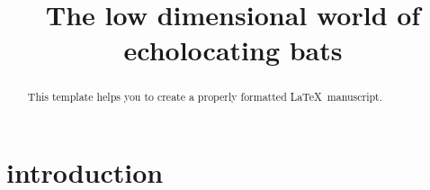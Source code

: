 \documentclass[preprint,5p]{elsarticle}
\begin{document}
\newcommand{\pca}{25}
\newcommand{\prepca}{92}
\newcommand{\nneurons}{200}
\newcommand{\nweights}{37 thousand}

\newcommand{\noise}{\mathcal{N}}
\newcommand{\noisefloor}{\mathcal{N}_f}
\newcommand{\stochasticnoise}{\mathcal{N}_s}
\newcommand{\db}{dB}


\newcommand{\PCA}{\gls{PCA}} 

\newcommand{\pc}{\gls{pc}} 
\newcommand{\pcs}{\glspl{pc}} 



\begin{frontmatter}

\title{The low dimensional world of echolocating bats}






\begin{abstract}
This template helps you to create a properly formatted \LaTeX\ manuscript.
\end{abstract}


\end{frontmatter}


\section{introduction}
\end{document}
